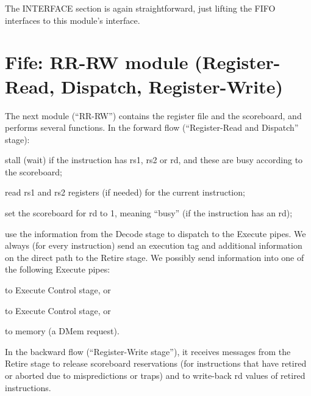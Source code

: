 The INTERFACE section is again straightforward, just lifting the FIFO
interfaces to this module's interface.


\section{Fife: RR-RW module (Register-Read, Dispatch, Register-Write)}

\label{Sec_Fife_RR_RW_module}

The next module (``RR-RW'') contains the register file and the
scoreboard, and performs several functions. In the forward flow
(``Register-Read and Dispatch'' stage):

\begin{tightlist}

  \item stall (wait) if the instruction has rs1, rs2 or rd, and these
        are busy according to the scoreboard;

  \item read rs1 and rs2 registers (if needed) for the current instruction;

  \item set the scoreboard for rd to 1, meaning ``busy'' (if the
        instruction has an rd);

  \item use the information from the Decode stage to dispatch to the
        Execute pipes.  We always (for every instruction) send an
        execution tag and additional information on the direct path to
        the Retire stage.  We possibly send information into one of
        the following Execute pipes:

  \begin{tightlist}
    \item to Execute Control stage, or
    \item to Execute Control stage, or
    \item to memory (a DMem request).
  \end{tightlist}

\end{tightlist}

In the backward flow (``Register-Write stage''), it receives messages
from the Retire stage to release scoreboard reservations (for
instructions that have retired or aborted due to mispredictions or
traps) and to write-back rd values of retired instructions.

